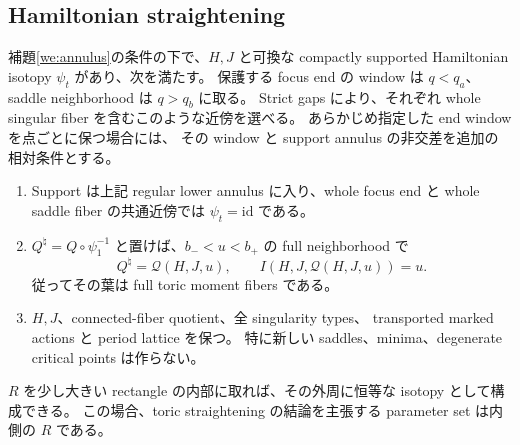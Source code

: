 \subsection{Hamiltonian straightening}

\begin{theorem}[全作用を保つ相対整形]\label{we:straightening}
補題\ref{we:annulus}の条件の下で、$H,J$ と可換な compactly supported
Hamiltonian isotopy $\psi_t$ があり、次を満たす。
保護する focus end の window は $q<q_a$、saddle neighborhood は $q>q_b$ に取る。
Strict gaps により、それぞれ whole singular fiber を含むこのような近傍を選べる。
あらかじめ指定した end window を点ごとに保つ場合には、
その window と support annulus の非交差を追加の相対条件とする。
\begin{enumerate}
\item Support は上記 regular lower annulus に入り、whole focus end と
  whole saddle fiber の共通近傍では $\psi_t=\mathrm{id}$ である。
\item $Q^\natural=Q\circ\psi_1^{-1}$ と置けば、$b_-<u<b_+$ の full neighborhood で
  \begin{equation}\label{we:toric}
   Q^\natural=\mathcal Q(H,J,u),\qquad I(H,J,\mathcal Q(H,J,u))=u.
  \end{equation}
  従ってその葉は full toric moment fibers である。
\item $H,J$、connected-fiber quotient、全 singularity types、
  transported marked actions と period lattice を保つ。
  特に新しい saddles、minima、degenerate critical points は作らない。
\end{enumerate}
$R$ を少し大きい rectangle の内部に取れば、その外周に恒等な isotopy として構成できる。
この場合、toric straightening の結論を主張する parameter set は内側の $R$ である。
\end{theorem}

